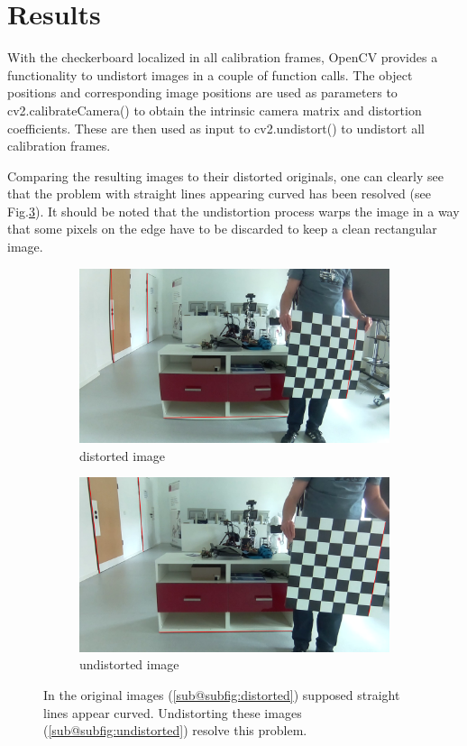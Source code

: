 \documentclass[bibliography=totoc]{scrartcl}
\begin{document}
\section{Results}
With the checkerboard localized in all calibration frames, OpenCV provides a functionality to undistort images in a couple of function calls.
The object positions and corresponding image positions are used as parameters to cv2.calibrateCamera() to obtain the intrinsic camera matrix and distortion coefficients.
These are then used as input to cv2.undistort() to undistort all calibration frames.

Comparing the resulting images to their distorted originals, one can clearly see that the problem with straight lines appearing curved has been resolved (see Fig.\ref{fig:comparison}).
It should be noted that the undistortion process warps the image in a way that some pixels on the edge have to be discarded to keep a clean rectangular image.

\begin{figure}[H]
	\centering
	\begin{subfigure}[t]{0.45\linewidth}
		\includegraphics[width=\linewidth]{imgs/distorted.png}
		\caption{distorted image}
		\label{subfig:distorted}
	\end{subfigure}
	\hspace{0.02\textwidth}
	\begin{subfigure}[t]{0.45\linewidth}
		\includegraphics[width=\linewidth]{imgs/undistorted.png}
		\caption{undistorted image}
		\label{subfig:undistorted}
	\end{subfigure}
    \caption{In the original images (\ref{sub@subfig:distorted}) supposed straight lines appear curved. Undistorting these images (\ref{sub@subfig:undistorted}) resolve this problem.}
	\label{fig:comparison}
\end{figure}
\end{document}
